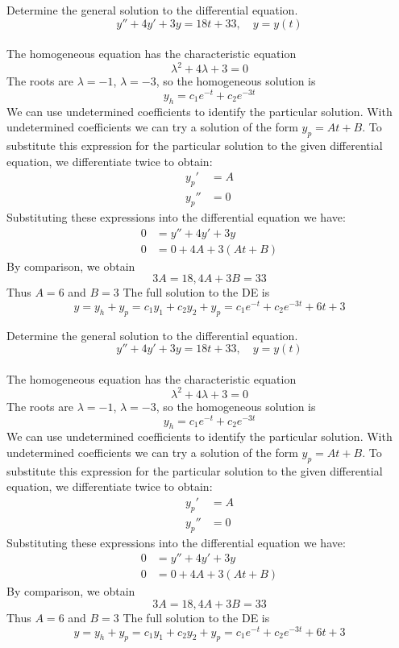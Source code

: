 \ifnum {}
\question[7] Determine the general solution to the differential equation. 
$$y'' +4y'+3y = 18t+33, \quad y=y(t)$$
\ifnum {} {\color{DarkBlue} \\[12pt] 
The homogeneous equation has the characteristic equation
$$\lambda ^2+4\lambda + 3 = 0$$
The roots are $\lambda= -1$, $\lambda = -3$, so the homogeneous solution is
$$y_h = c_1 e^{-t} + c_2 e^{-3t} $$
We can use undetermined coefficients to identify the particular solution. With undetermined coefficients we can try a solution of the form $y_p = At+B$. To substitute this expression for the particular solution to the given differential equation, we differentiate twice to obtain:
\begin{align}
    y_p ' &=  A \\
    y_p'' &= 0
\end{align}
Substituting these expressions into the differential equation we have:
\begin{align}
    0 &= y'' + 4y' + 3y \\
    0 &= 0 + 4A +3(At+B)
\end{align}
By comparison, we obtain
$$ 3A = 18, 4A+3B = 33$$
Thus $A=6$ and $B=3$
The full solution to the DE is
$$y = y_h + y_p = c_1y_1  + c_2y_2 + y_p = c_1e^{-t} + c_2 e^{-3t} + 6t+3$$
} 
\else 
\vspace{3cm}
\fi
\fi  

\ifnum {}
\question[7] Determine the general solution to the differential equation. 
$$y'' +4y'+3y = 18t+33, \quad y=y(t)$$
\ifnum {} {\color{DarkBlue} \\[12pt] 
The homogeneous equation has the characteristic equation
$$\lambda ^2+4\lambda + 3 = 0$$
The roots are $\lambda= -1$, $\lambda = -3$, so the homogeneous solution is
$$y_h = c_1 e^{-t} + c_2 e^{-3t} $$
We can use undetermined coefficients to identify the particular solution. With undetermined coefficients we can try a solution of the form $y_p = At+B$. To substitute this expression for the particular solution to the given differential equation, we differentiate twice to obtain:
\begin{align}
    y_p ' &=  A \\
    y_p'' &= 0
\end{align}
Substituting these expressions into the differential equation we have:
\begin{align}
    0 &= y'' + 4y' + 3y \\
    0 &= 0 + 4A +3(At+B)
\end{align}
By comparison, we obtain
$$ 3A = 18, 4A+3B = 33$$
Thus $A=6$ and $B=3$
The full solution to the DE is
$$y = y_h + y_p = c_1y_1  + c_2y_2 + y_p = c_1e^{-t} + c_2 e^{-3t} + 6t+3$$
} 
\else 
\vspace{3cm}
\fi
\fi 


